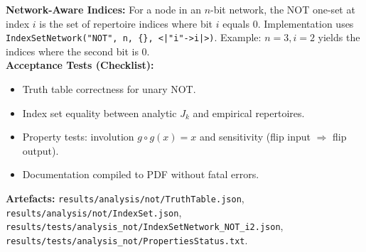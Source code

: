 \documentclass[11pt]{article}
\begin{document}
\textbf{Network-Aware Indices:} For a node in an \(n\)-bit network, the NOT one-set at index \(i\) is the set of repertoire indices where bit \(i\) equals 0. Implementation uses \texttt{IndexSetNetwork("NOT", n, \{\}, \texttt{<|"i"->i|>})}. Example: \(n=3, i=2\) yields the indices where the second bit is 0.\\
\textbf{Acceptance Tests (Checklist):}
\begin{itemize}
 \item Truth table correctness for unary NOT.
 \item Index set equality between analytic \(J_k\) and empirical repertoires.
 \item Property tests: involution \(g\circ g(x)=x\) and sensitivity (flip input \(\Rightarrow\) flip output).
 \item Documentation compiled to PDF without fatal errors.
\end{itemize}
\textbf{Artefacts:} \texttt{results/analysis/not/TruthTable.json}, \texttt{results/analysis/not/IndexSet.json}, \texttt{results/tests/analysis\_not/IndexSetNetwork\_NOT\_i2.json}, \texttt{results/tests/analysis\_not/PropertiesStatus.txt}.
\end{document}
